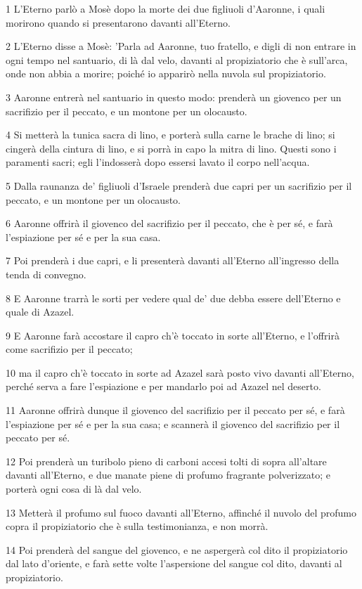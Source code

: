 \par 1 L'Eterno parlò a Mosè dopo la morte dei due figliuoli d'Aaronne, i quali morirono quando si presentarono davanti all'Eterno.
\par 2 L'Eterno disse a Mosè: 'Parla ad Aaronne, tuo fratello, e digli di non entrare in ogni tempo nel santuario, di là dal velo, davanti al propiziatorio che è sull'arca, onde non abbia a morire; poiché io apparirò nella nuvola sul propiziatorio.
\par 3 Aaronne entrerà nel santuario in questo modo: prenderà un giovenco per un sacrifizio per il peccato, e un montone per un olocausto.
\par 4 Si metterà la tunica sacra di lino, e porterà sulla carne le brache di lino; si cingerà della cintura di lino, e si porrà in capo la mitra di lino. Questi sono i paramenti sacri; egli l'indosserà dopo essersi lavato il corpo nell'acqua.
\par 5 Dalla raunanza de' figliuoli d'Israele prenderà due capri per un sacrifizio per il peccato, e un montone per un olocausto.
\par 6 Aaronne offrirà il giovenco del sacrifizio per il peccato, che è per sé, e farà l'espiazione per sé e per la sua casa.
\par 7 Poi prenderà i due capri, e li presenterà davanti all'Eterno all'ingresso della tenda di convegno.
\par 8 E Aaronne trarrà le sorti per vedere qual de' due debba essere dell'Eterno e quale di Azazel.
\par 9 E Aaronne farà accostare il capro ch'è toccato in sorte all'Eterno, e l'offrirà come sacrifizio per il peccato;
\par 10 ma il capro ch'è toccato in sorte ad Azazel sarà posto vivo davanti all'Eterno, perché serva a fare l'espiazione e per mandarlo poi ad Azazel nel deserto.
\par 11 Aaronne offrirà dunque il giovenco del sacrifizio per il peccato per sé, e farà l'espiazione per sé e per la sua casa; e scannerà il giovenco del sacrifizio per il peccato per sé.
\par 12 Poi prenderà un turibolo pieno di carboni accesi tolti di sopra all'altare davanti all'Eterno, e due manate piene di profumo fragrante polverizzato; e porterà ogni cosa di là dal velo.
\par 13 Metterà il profumo sul fuoco davanti all'Eterno, affinché il nuvolo del profumo copra il propiziatorio che è sulla testimonianza, e non morrà.
\par 14 Poi prenderà del sangue del giovenco, e ne aspergerà col dito il propiziatorio dal lato d'oriente, e farà sette volte l'aspersione del sangue col dito, davanti al propiziatorio.
